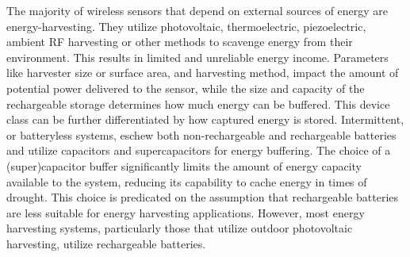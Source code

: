 The majority of wireless sensors that depend on external sources of energy are energy-harvesting. They utilize
photovoltaic, thermoelectric, piezoelectric, ambient RF harvesting or other methods to scavenge energy from their environment.
This results in limited and unreliable energy income.
Parameters like harvester size or surface area, and harvesting method, impact the amount of potential power delivered to the sensor, while the size and capacity of the rechargeable storage determines how much energy can be buffered.
This device class can be further differentiated by how captured energy is stored. Intermittent, or batteryless systems, eschew both non-rechargeable and rechargeable batteries and utilize capacitors and supercapacitors for energy buffering. The choice of a (super)capacitor buffer significantly limits the amount of energy capacity available to the system, reducing its capability to cache energy in times of drought. This choice is predicated on the assumption that rechargeable batteries are less suitable for energy harvesting applications. However, most energy harvesting systems, particularly those that utilize outdoor photovoltaic harvesting, utilize rechargeable batteries.


